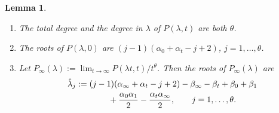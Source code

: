 \documentclass[pdftex]{sigma}
\numberwithin{equation}{section}
\newtheorem{Lemma}[Theorem]{Lemma}
\begin{document}
\begin{Lemma} \label{lemma: P in lambda} \qquad
 \begin{enumerate}\itemsep=0pt
 \item[$({\rm i})$] The total degree and the degree in $\lambda$ of
 $P(\lambda,t)$ are both $\theta$.
 \item[$({\rm ii})$] The roots of $P(\lambda,0)$ are
 $(j-1)(\alpha_0+\alpha_t-j+2)$, $j=1,\dots,\theta$.
 \item[$({\rm iii})$] Let $P_\infty(\lambda):=\lim_{t\to\infty}P(\lambda
 t,t)/t^\theta$. Then the roots of $P_\infty(\lambda)$ are
 \begin{gather}
 \hat\lambda_j:=(j-1)(\alpha_\infty+\alpha_t-j+2)
 -\beta_\infty-\beta_t+\beta_0+\beta_1\nonumber\\
 \hphantom{\hat\lambda_j:=}{} +\frac{\alpha_0\alpha_1}2
 -\frac{\alpha_t\alpha_\infty}2,\qquad j=1,\dots,\theta.\label{eq: roots infinity}
 \end{gather}
 \end{enumerate}
\end{Lemma}
\end{document}
